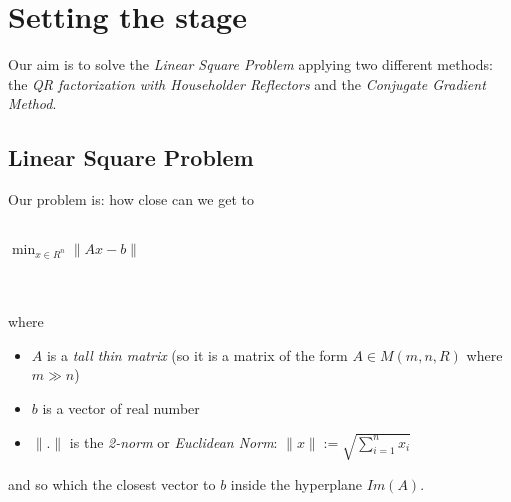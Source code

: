\documentclass{article}
\begin{document}
\section{Setting the stage}
Our aim is to solve the
\textit{Linear Square Problem}
applying two different methods: the
\textit{QR factorization with Householder Reflectors} and the
\textit{Conjugate Gradient Method}.

\subsection{Linear Square Problem}
Our problem is: how close can we get to \\\\
\centerline{$\min_{x \in R^n}\|Ax-b\|$} \\\\
where
\begin{itemize}
	\item $A$ is a \textit{tall thin matrix} (so it is a matrix of the form $A\in M(m, n, R)$ where $m \gg n$)
	\item $b$ is a vector of real number
	\item $\|.\|$ is the \textit{2-norm} or \textit{Euclidean Norm}: $\|x\| := \sqrt{\sum_{i=1}^n x_i}$
\end{itemize}
and so which the closest vector to $b$ inside the hyperplane $Im(A)$.
\end{document}
